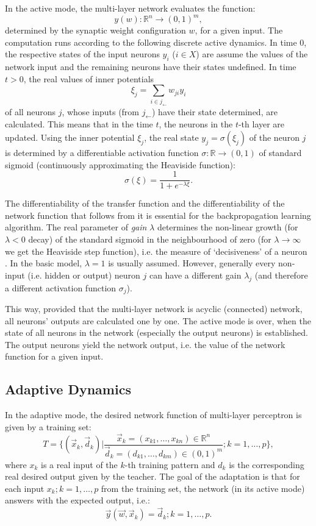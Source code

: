 In the active mode, the multi-layer network evaluates the function:
$$ y(w) : \mathbb{R}^n \rightarrow (0, 1)^m, $$
determined by the synaptic weight configuration $ w $, for a given input. The computation runs according to the following discrete active dynamics. In time 0, the respective states of the input neurons $ y_i $ ($ i \in X $) are assume the values of the network input and the remaining neurons have their states undefined. In time $ t > 0 $, the real values of inner potentials
$$ \xi_j = \sum_{i \in j_\leftarrow}{w_{ji}y_{i}} $$
of all neurons $ j $, whose inputs (from $ j_\leftarrow $) have their state determined, are calculated. This means that in the time $ t $, the neurons in the $ t $-th layer are updated. Using the inner potential $ \xi_j $, the real state $ y_j = \sigma(\xi_j) $ of the neuron $ j $ is determined by a differentiable activation function $ \sigma : \mathbb{R} \rightarrow (0, 1) $ of standard sigmoid (continuously approximating the Heaviside function):
$$ \sigma(\xi) = \frac{1}{1 + e^{-\lambda \xi}}. $$

The differentiability of the transfer function and the differentiability of the network function that follows from it is essential for the backpropagation learning algorithm. The real parameter of \textit{gain} $ \lambda $ determines the non-linear growth (for $ \lambda < 0 $ decay) of the standard sigmoid in the neighbourhood of zero (for $ \lambda \rightarrow \infty $ we get the Heaviside step function), i.e. the measure of `decisiveness' of a neuron \cite{Sima96}. In the basic model, $ \lambda = 1 $ is usually assumed. However, generally every non-input (i.e. hidden or output) neuron $ j $ can have a different gain $ \lambda_j $ (and therefore a different activation function $ \sigma_j $).

This way, provided that the multi-layer network is acyclic (connected) network, all neurons' outputs are calculated one by one. The active mode is over, when the state of all neurons in the network (especially the output neurons) is established. The output neurons yield the network output, i.e. the value of the network function for a given input.

\subsection{Adaptive Dynamics}

In the adaptive mode, the desired network function of multi-layer perceptron is given by a training set:
$$ T = \{(\vec{x}_k, \vec{d}_k) | \frac{\vec{x}_k = (x_{k1}, \ldots, x_{kn}) \in \mathbb{R}^n}{\vec{d}_k = (d_{k1}, \dots, d_{km}) \in (0,1)^m}; k = 1, \ldots, p\}, $$
where $ x_k $ is a real input of the $ k $-th training pattern and $ d_k $ is the corresponding real desired output given by the teacher. The goal of the adaptation is that for each input $ x_k; k = 1, \ldots, p $ from the training set, the network (in its active mode) answers with the expected output, i.e.:
$$ \vec{y}(\vec{w},\vec{x}_k) = \vec{d}_k; k = 1, \ldots, p. $$

